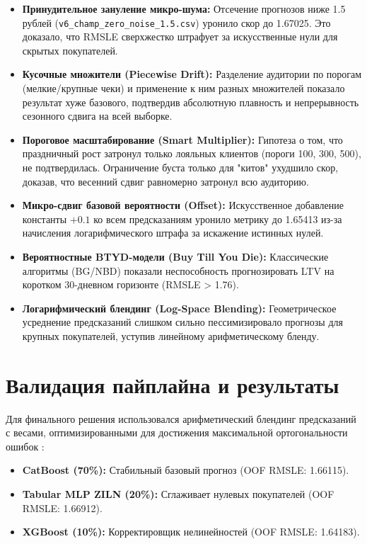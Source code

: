 \documentclass[12pt, a4paper]{article}
\begin{document}
	\begin{itemize}
		\item \textbf{Принудительное зануление микро-шума:} Отсечение прогнозов ниже 1.5 рублей (\texttt{v6\_champ\_zero\_noise\_1.5.csv}) уронило скор до 1.67025. Это доказало, что RMSLE сверхжестко штрафует за искусственные нули для скрытых покупателей.
		\item \textbf{Кусочные множители (Piecewise Drift):} Разделение аудитории по порогам (мелкие/крупные чеки) и применение к ним разных множителей показало результат хуже базового, подтвердив абсолютную плавность и непрерывность сезонного сдвига на всей выборке.
		\item \textbf{Пороговое масштабирование (Smart Multiplier):} Гипотеза о том, что праздничный рост затронул только лояльных клиентов (пороги 100, 300, 500), не подтвердилась. Ограничение буста только для "китов" ухудшило скор, доказав, что весенний сдвиг равномерно затронул всю аудиторию.
		\item \textbf{Микро-сдвиг базовой вероятности (Offset):} Искусственное добавление константы $+0.1$ ко всем предсказаниям уронило метрику до 1.65413 из-за начисления логарифмического штрафа за искажение истинных нулей.
		\item \textbf{Вероятностные BTYD-модели (Buy Till You Die):} Классические алгоритмы (BG/NBD) показали неспособность прогнозировать LTV на коротком 30-дневном горизонте (RMSLE > 1.76).
		\item \textbf{Логарифмический блендинг (Log-Space Blending):} Геометрическое усреднение предсказаний слишком сильно пессимизировало прогнозы для крупных покупателей, уступив линейному арифметическому бленду.
	\end{itemize}
	
	\section{Валидация пайплайна и результаты}
	
	Для финального решения использовался арифметический блендинг предсказаний с весами, оптимизированными для достижения максимальной ортогональности ошибок \cite{ref:train}:
	\begin{itemize}
		\item \textbf{CatBoost (70\%):} Стабильный базовый прогноз (OOF RMSLE: 1.66115).
		\item \textbf{Tabular MLP ZILN (20\%):} Сглаживает нулевых покупателей (OOF RMSLE: 1.66912).
		\item \textbf{XGBoost (10\%):} Корректировщик нелинейностей (OOF RMSLE: 1.64183).
	\end{itemize}
	
\end{document}
